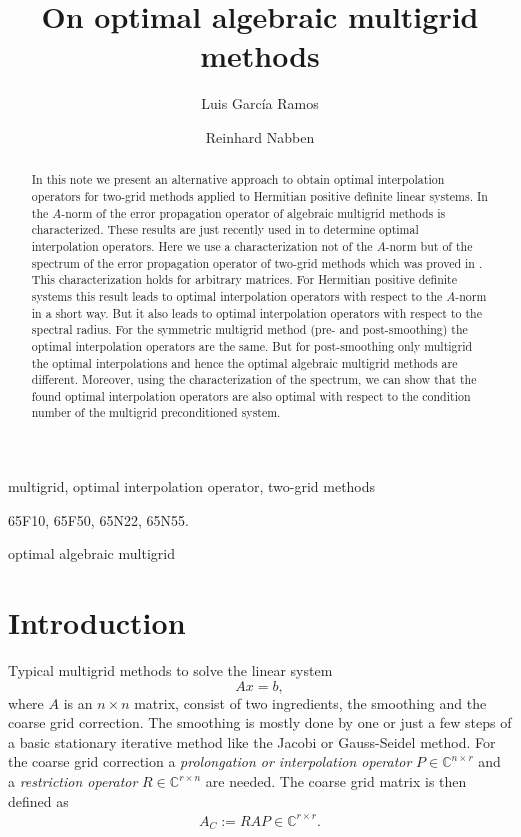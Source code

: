 \documentclass[final]{amsart}
\author{
Luis Garc\'{i}a Ramos\footnotemark[1]
\and
Reinhard Nabben\footnotemark[1]
}
\title{On optimal algebraic multigrid methods}
\newcommand{\innCrr}{\in\mathbb{C}^{r\times r}}
\newcommand{\beq}{\begin{eqnarray}}
\newcommand{\eeq}{\end{eqnarray}}
\numberwithin{equation}{section}
\newcommand{\Crn}{\mathbb{C}^{r \times n}}
\newcommand{\Cnr}{\mathbb{C}^{n \times r}}
\begin{document}
\maketitle
\renewcommand{\thefootnote}{\fnsymbol{footnote}}

\renewcommand{\thefootnote}{\arabic{footnote}}
\begin{abstract}
In this note we present an alternative approach  to obtain optimal
interpolation operators for two-grid methods applied to Hermitian positive
definite  linear systems.  In \cite{FalVZ05,Zik08} the $A$-norm of the error
propagation operator of algebraic multigrid methods is characterized. These
results are just recently used in \cite{XuZ17, Bra18} to determine  optimal
interpolation operators. Here we use a characterization not of the $A$-norm but
of the spectrum of the  error propagation operator of two-grid methods which
was proved in  \cite{GarKN18}. This characterization holds for arbitrary
matrices. For Hermitian positive definite systems this result   leads to
optimal interpolation operators with respect to the $A$-norm in a short way.
But it also leads  to optimal interpolation operators with respect to the
spectral radius. For the symmetric multigrid method (pre- and  post-smoothing)
the optimal interpolation operators are  the same. But for post-smoothing only
multigrid the optimal interpolations and hence the optimal algebraic multigrid
methods are  different.  Moreover, using the  characterization of the spectrum,
we can show that the found   optimal interpolation operators are also optimal
with
respect to the condition number  of the multigrid preconditioned system.  
\end{abstract}


\begin{keywords}
multigrid, optimal interpolation operator, two-grid methods
\end{keywords}

\begin{AMS}
65F10, 65F50, 65N22, 65N55.
\end{AMS}

\pagestyle{myheadings}
\thispagestyle{plain}
 {optimal algebraic multigrid}

\section{Introduction}
Typical multigrid methods to solve the linear system 
\[
Ax = b,
\]
where $A$ is an $n \times n$ matrix, consist  of two ingredients, the smoothing
and  the
coarse grid correction. The smoothing is mostly done by one or just a few
steps of a  basic stationary iterative method like the Jacobi or Gauss-Seidel
method.  For the coarse grid correction
 a {\it prolongation or interpolation
operator} $P \in \Cnr$ and a    {\it
restriction operator} $R \in \Crn$  are needed. The coarse grid matrix is then
defined as
\beq \label{def:multAC}
A_C :=  RAP \innCrr.
\eeq 
\end{document}
